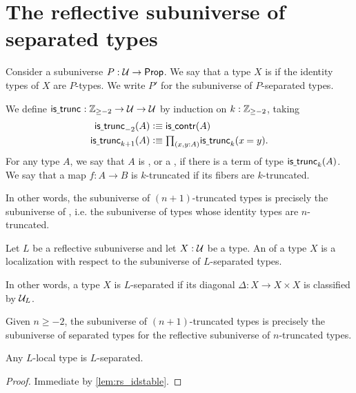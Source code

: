 \section{The reflective subuniverse of separated types}\label{sec:separated}

\begin{defn}
Consider a subuniverse $P:\mathcal{U}\to\mathsf{Prop}$. We say that a type $X$ is  if the identity types of $X$ are $P$-types. We write $P'$ for the subuniverse of $P$-separated types.
\end{defn}

\begin{eg}
We define $\mathsf{is\underline{\ }{}trunc}_{} : \mathbb{Z}_{\geq-2}\to\mathcal{U}\to\mathcal{U}$ by induction on $k:\mathbb{Z}_{\geq -2}$, taking
\begin{align*}
\istrunc{-2}(A) & \defeq \iscontr(A) \\
\istrunc{k+1}(A) & \defeq \prd{x,y:A}\istrunc{k}(\id{x}{y}).\qedhere
\end{align*}
For any type $A$, we say that $A$ is , or a , if there is a term of type $\mathsf{is\underline{\ }{}trunc}_{k}(A)$. We say that a map $f:A\to B$ is $k$-truncated if its fibers are $k$-truncated.

In other words, the subuniverse of $(n+1)$-truncated types is precisely the subuniverse of , i.e. the subuniverse of types whose identity types are $n$-truncated.
\end{eg}

\begin{defn}
Let $L$ be a reflective subuniverse and let $X : \mathcal{U}$ be a type. 
An  of a type $X$ is a localization with respect to the subuniverse of $L$-separated types.
\end{defn}

In other words, a type $X$ is $L$-separated if its diagonal $\Delta:X\to X\times X$ is classified by $\mathcal{U}_L$.

\begin{eg}\label{example:truncationisseparated}
Given $n \geq -2$, the subuniverse of $(n+1)$-truncated types is precisely the subuniverse of separated types for the reflective subuniverse of $n$-truncated types.
\end{eg}

\begin{lem}
Any $L$-local type is $L$-separated.
\end{lem}

\begin{proof}
Immediate by \cref{lem:rs_idstable}.
\end{proof}

